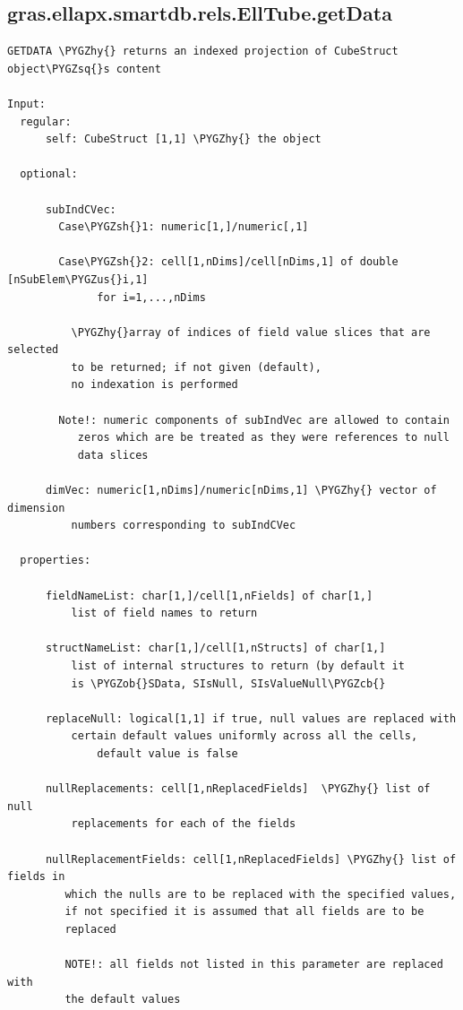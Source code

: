 \documentclass[letterpaper,10pt,english]{sphinxmanual}
\def\PYGZus{\char`\_}
\def\PYGZob{\char`\{}
\def\PYGZcb{\char`\}}
\def\PYGZsh{\char`\#}
\def\PYGZhy{\char`\-}
\def\PYGZsq{\char`\'}
\begin{document}
\subsection{gras.ellapx.smartdb.rels.EllTube.getData}
\label{chap_functions:gras-ellapx-smartdb-rels-elltube-getdata}
\begin{Verbatim}[commandchars=\\\{\}]
GETDATA \PYGZhy{} returns an indexed projection of CubeStruct object\PYGZsq{}s content

Input:
  regular:
      self: CubeStruct [1,1] \PYGZhy{} the object

  optional:

      subIndCVec:
        Case\PYGZsh{}1: numeric[1,]/numeric[,1]

        Case\PYGZsh{}2: cell[1,nDims]/cell[nDims,1] of double [nSubElem\PYGZus{}i,1]
              for i=1,...,nDims

          \PYGZhy{}array of indices of field value slices that are selected
          to be returned; if not given (default),
          no indexation is performed

        Note!: numeric components of subIndVec are allowed to contain
           zeros which are be treated as they were references to null
           data slices

      dimVec: numeric[1,nDims]/numeric[nDims,1] \PYGZhy{} vector of dimension
          numbers corresponding to subIndCVec

  properties:

      fieldNameList: char[1,]/cell[1,nFields] of char[1,]
          list of field names to return

      structNameList: char[1,]/cell[1,nStructs] of char[1,]
          list of internal structures to return (by default it
          is \PYGZob{}SData, SIsNull, SIsValueNull\PYGZcb{}

      replaceNull: logical[1,1] if true, null values are replaced with
          certain default values uniformly across all the cells,
              default value is false

      nullReplacements: cell[1,nReplacedFields]  \PYGZhy{} list of null
          replacements for each of the fields

      nullReplacementFields: cell[1,nReplacedFields] \PYGZhy{} list of fields in
         which the nulls are to be replaced with the specified values,
         if not specified it is assumed that all fields are to be
         replaced

         NOTE!: all fields not listed in this parameter are replaced with
         the default values


\end{Verbatim}
\end{document}

